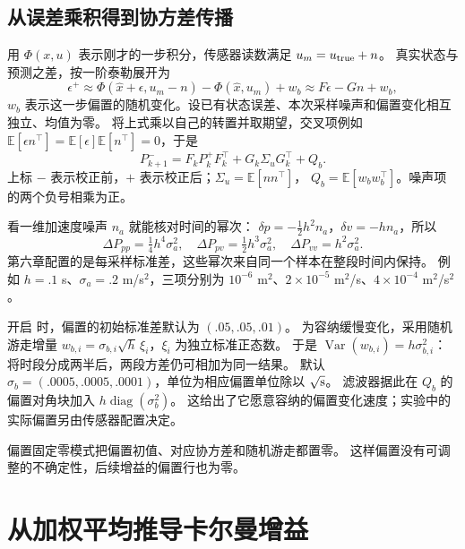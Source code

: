 \subsection{从误差乘积得到协方差传播}
用 $\Phi(x,u)$ 表示刚才的一步积分，传感器读数满足 $u_m=u_{\rm true}+n$。
真实状态与预测之差，按一阶泰勒展开为
\begin{equation}
\epsilon^+\approx\Phi(\hat x+\epsilon,u_m-n)-\Phi(\hat x,u_m)+w_b
\approx F\epsilon-Gn+w_b,
\end{equation}
$w_b$ 表示这一步偏置的随机变化。设已有状态误差、本次采样噪声和偏置变化相互独立、均值为零。
将上式乘以自己的转置并取期望，交叉项例如
$\mathbb E[\epsilon n^\top]=\mathbb E[\epsilon]\mathbb E[n^\top]=0$，于是
\begin{equation}
P^-_{k+1}=F_kP^+_kF_k^\top+G_k\Sigma_uG_k^\top+Q_b.
\end{equation}
上标 $-$ 表示校正前，$+$ 表示校正后；$\Sigma_u=\mathbb E[nn^\top]$，
$Q_b=\mathbb E[w_bw_b^\top]$。噪声项的两个负号相乘为正。

看一维加速度噪声 $n_a$ 就能核对时间的幂次：
$\delta p=-\tfrac12h^2n_a$，$\delta v=-hn_a$，所以
\begin{equation}
\Delta P_{pp}=\tfrac14h^4\sigma_a^2,\quad
\Delta P_{pv}=\tfrac12h^3\sigma_a^2,\quad
\Delta P_{vv}=h^2\sigma_a^2.
\end{equation}
第六章配置的是每采样标准差，这些幂次来自同一个样本在整段时间内保持。
例如 $h=.1$ s、$\sigma_a=.2$ m/s$^2$，三项分别为
$10^{-6}$ m$^2$、$2\times10^{-5}$ m$^2$/s、$4\times10^{-4}$ m$^2$/s$^2$。

开启  时，偏置的初始标准差默认为 $(.05,.05,.01)$。
为容纳缓慢变化，采用随机游走增量
$w_{b,i}=\sigma_{b,i}\sqrt h\,\xi_i$，$\xi_i$ 为独立标准正态数。
于是 $\operatorname{Var}(w_{b,i})=h\sigma_{b,i}^2$：将时段分成两半后，两段方差仍可相加为同一结果。
默认 $\sigma_b=(.0005,.0005,.0001)$，单位为相应偏置单位除以 $\sqrt{\rm s}$。
滤波器据此在 $Q_b$ 的偏置对角块加入 $h\operatorname{diag}(\sigma_b^2)$。
这给出了它愿意容纳的偏置变化速度；实验中的实际偏置另由传感器配置决定。


偏置固定零模式把偏置初值、对应协方差和随机游走都置零。
这样偏置没有可调整的不确定性，后续增益的偏置行也为零。

\section{从加权平均推导卡尔曼增益}
